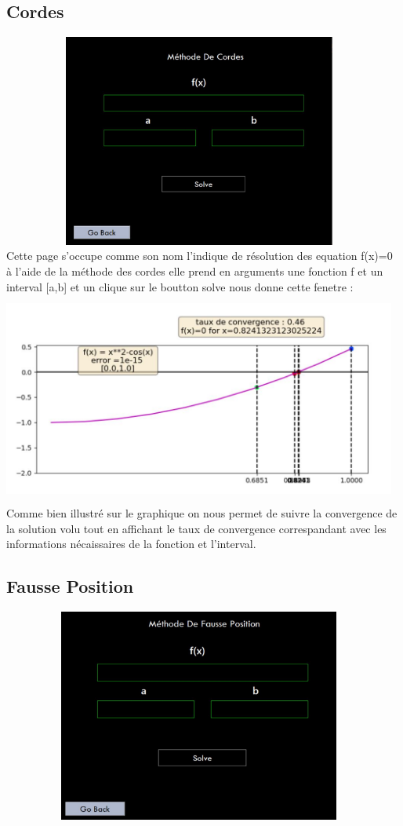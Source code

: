 \documentclass{article}
\begin{document}
\subsection{Cordes}
\includegraphics[width=13cm,height=7cm]{img/cordes.JPG}\\

Cette page s'occupe comme son nom l'indique de résolution des equation f(x)=0 à l'aide de la méthode des cordes elle prend en arguments une fonction f et un interval [a,b] et un clique sur le boutton solve nous donne cette fenetre :\\ 
\includegraphics[width=13cm,height=7cm]{img/cordes_graph.JPG}\\

Comme bien illustré sur le graphique on nous permet de suivre la convergence de la solution volu tout en affichant le taux de convergence correspandant avec les informations nécaissaires de la fonction et l'interval.\\
\subsection{Fausse Position}
\includegraphics[width=13cm,height=7cm]{img/fausse_pos.JPG}\\
\end{document}

